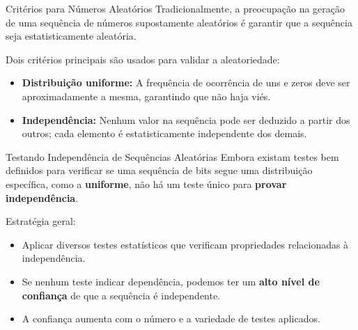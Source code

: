\begin{frame}{Critérios para Números Aleatórios}
    Tradicionalmente, a preocupação na geração de uma sequência de números supostamente aleatórios é garantir que a sequência seja estatisticamente aleatória.

    \medskip
    Dois critérios principais são usados para validar a aleatoriedade:

    \begin{itemize}
        \item \textbf{Distribuição uniforme:}
              A frequência de ocorrência de uns e zeros deve ser aproximadamente a mesma, garantindo que não haja viés.

        \item \textbf{Independência:}
              Nenhum valor na sequência pode ser deduzido a partir dos outros; cada elemento é estatisticamente independente dos demais.
    \end{itemize}

\end{frame}

\begin{frame}{Testando Independência de Sequências Aleatórias}
    Embora existam testes bem definidos para verificar se uma sequência de bits segue uma distribuição específica, como a \textbf{uniforme}, não há um teste único para \textbf{provar independência}.

    \medskip
    Estratégia geral:

    \begin{itemize}
        \item Aplicar diversos testes estatísticos que verificam propriedades relacionadas à independência.
        \item Se nenhum teste indicar dependência, podemos ter um \textbf{alto nível de confiança} de que a sequência é independente.
        \item A confiança aumenta com o número e a variedade de testes aplicados.
    \end{itemize}

\end{frame}


